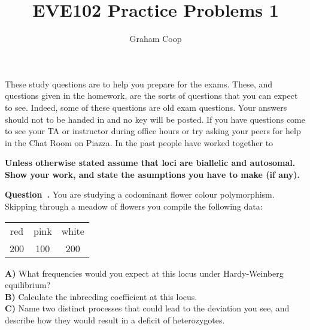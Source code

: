 \documentclass[12pt]{article}
\newcounter{question}[section]   %
\newenvironment{question}[1][]{\refstepcounter{question}\par\medskip
   \textbf{Question~\thequestion. #1} \rmfamily}{\medskip}
\begin{document}
\title{EVE102 Practice Problems 1}
\author{Graham Coop}
\date{}
\maketitle

These study questions are to help you prepare for the exams.
These, and questions given in the homework, are the sorts of questions
that you can expect to see. Indeed, some of these questions are old
exam questions.  Your answers should not to be handed in and no key
will be posted.  If you have questions come to see your TA or
instructor during office hours or try asking your peers for help in
the Chat Room on Piazza. In the past people have worked together to 

{\bf Unless otherwise stated assume that loci are biallelic and
autosomal. Show your work, and state the asumptions you have to make
(if any). }

\begin{question}
You are studying a codominant flower colour polymorphism. Skipping
through a meadow of flowers you compile the following data:
\begin{center}
\begin{tabular}{ccc}
red & pink  & white\\
200 & 100 & 200\\
\end{tabular}
\end{center}
{\bf A)} What frequencies would you expect at this locus under Hardy-Weinberg equilibrium? \\
{\bf B)} Calculate the inbreeding coefficient at this locus.\\ 
{\bf C)} Name two distinct processes that could lead to the deviation
you see, and describe how they would result in a deficit of heterozygotes.
\end{question}
\end{document}
